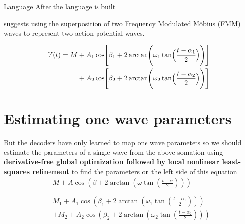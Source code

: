 \begin{frame}[allowframebreaks]{Language}
    After the language is built
    
    \cite{rueda-2021-a-novel-wave-decomposition-for-oscillatory-signals} suggests using the superposition of two Frequency Modulated M\"obius (FMM) waves to represent two action potential waves.
    
    \begin{equation}
        \begin{aligned}
            V(t)
            =
            M
            &+
            A_1
            \cos
            \Biggl[
                \beta_1
                +
                2
                \arctan
                \Biggl(
                \omega_1
                \tan
                \Bigl(
                \frac{t-\alpha_1}{2}
                \Bigr)
                \Biggr)
                \Biggr]
            \\
            &+
            A_2
            \cos
            \Biggl[
                \beta_2
                +
                2
                \arctan
                \Biggl(
                \omega_2
                \tan
                \Bigl(
                \frac{t-\alpha_2}{2}
                \Bigr)
                \Biggr)
                \Biggr]
        \end{aligned}
    \end{equation}
    
    
    \section{Estimating one wave parameters}
        But the decoders have only learned to map one wave parameters so we should estimate the parameters of a single wave from the above somation using \textbf{derivative-free global optimization followed by local nonlinear least-squares refinement} to find the parameters on the left side of this equation
        \[
            \begin{aligned}
                &M
                +
                A\cos\left(
                         \beta
                         +
                         2\arctan\left(
                                     \omega\tan\left(\frac{t-\alpha}{2}\right)
                    \right)
                \right)
                \\
                &=
                \\
                &M_1
                +
                A_1\cos\left(
                           \beta_1
                    +
                    2\arctan\left(
                                \omega_1\tan\left(\frac{t-\alpha_1}{2}\right)
                    \right)
                \right)
                \\
                &+
                M_2
                +
                A_2\cos\left(
                           \beta_2
                    +
                    2\arctan\left(
                                \omega_2\tan\left(\frac{t-\alpha_2}{2}\right)
                    \right)
                \right)
            \end{aligned}
        \]
\end{frame}